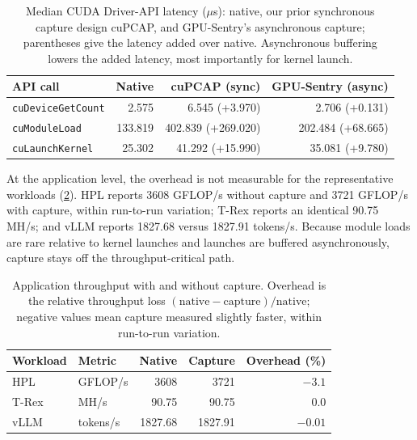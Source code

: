 \begin{table}[t]
    \centering
    \caption{Median CUDA Driver-API latency ($\mu$s): native, our prior synchronous capture design cuPCAP, and GPU-Sentry's asynchronous capture; parentheses give the latency added over native. Asynchronous buffering lowers the added latency, most importantly for kernel launch.}
    \label{tab:api_overhead}
    \footnotesize
    \begin{tabular}{lrrr}
        \toprule
        API call & Native & cuPCAP (sync) & GPU-Sentry (async) \\
        \midrule
        \texttt{cuDeviceGetCount} & 2.575 & 6.545 (+3.970) & 2.706 (+0.131) \\
        \texttt{cuModuleLoad} & 133.819 & 402.839 (+269.020) & 202.484 (+68.665) \\
        \texttt{cuLaunchKernel} & 25.302 & 41.292 (+15.990) & 35.081 (+9.780) \\
        \bottomrule
    \end{tabular}
\end{table}

At the application level, the overhead is not measurable for the representative workloads (\cref{tab:app_overhead}). HPL reports 3608 GFLOP/s without capture and 3721 GFLOP/s with capture, within run-to-run variation; T-Rex reports an identical 90.75 MH/s; and vLLM reports 1827.68 versus 1827.91 tokens/s. Because module loads are rare relative to kernel launches and launches are buffered asynchronously, capture stays off the throughput-critical path.

\begin{table}[t]
    \centering
    \caption{Application throughput with and without capture. Overhead is the relative throughput loss $(\mathrm{native}-\mathrm{capture})/\mathrm{native}$; negative values mean capture measured slightly faster, within run-to-run variation.}
    \label{tab:app_overhead}
    \begin{tabular}{llrrr}
        \toprule
        Workload & Metric & Native & Capture & Overhead (\%) \\
        \midrule
        HPL & GFLOP/s & 3608 & 3721 & $-3.1$ \\
        T-Rex & MH/s & 90.75 & 90.75 & $0.0$ \\
        vLLM & tokens/s & 1827.68 & 1827.91 & $-0.01$ \\
        \bottomrule
    \end{tabular}
\end{table}

